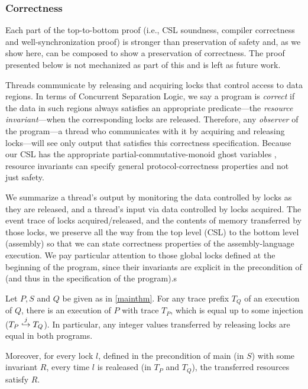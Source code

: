 \subsubsection{Correctness}

Each part of the top-to-bottom proof (i.e., CSL soundness, compiler correctness and well-synchronization proof) is stronger than preservation of safety and, as we show here, can be composed to show a preservation of correctness. The proof presented below is not mechanized as part of this  and is left as future work.

Threads communicate by releasing and acquiring locks that control access to
data regions.  In terms of Concurrent Separation Logic, we say
a program is \emph{correct} if the data in such regions always
satisfies an appropriate predicate---the \emph{resource invariant}---when
the corresponding locks are released.
Therefore, any \emph{observer} of the program---a thread who communicates with
it by acquiring and releasing locks---will see only output
that satisfies this correctness specification.
Because our CSL has the appropriate partial-commutative-monoid ghost variables
\cite{jung2015iris}, resource invariants
can specify general protocol-correctness properties
and not just safety. 

We summarize a thread's output
by monitoring the data controlled by locks as they are released,
and a thread's input via data controlled by locks acquired.
The event trace of locks acquired/released, and the contents of memory 
transferred by those locks, we preserve all the way from the
top level (CSL) to the bottom level (assembly) 
so that we can state correctness properties of
the assembly-language execution. 
We pay particular attention to those global locks defined at the beginning of the program, 
since their invariants are explicit in the precondition of  (and thus in the specification of the program).s

\begin{theorem}
Let $P, S$ and $Q$ be given as in \cref{mainthm}. For any trace prefix $T_Q$ of an execution of $Q$, there is an execution of $P$ with trace $T_P$, which is equal up to some injection ($T_P \overset{j}{\hookrightarrow} T_Q$). In particular, any integer values transferred by releasing locks are equal in both programs.

Moreover, for every lock $l$, defined in the precondition of main (in $S$) with some invariant $R$, every time $l$ is realeased (in $T_P$ and $T_Q$), the transferred resources satisfy $R$.
\end{theorem}

